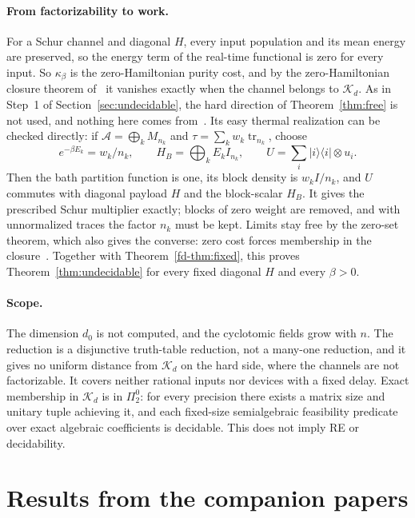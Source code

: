 \documentclass[11pt]{article}
\theoremstyle{definition}
\theoremstyle{remark}
\newcommand{\Trt}{\kappa_\beta}
\providecommand{\tr}{\operatorname{tr}}
\providecommand{\K}{\mathcal K}
\begin{document}
\paragraph{From factorizability to work.}
For a Schur channel and diagonal $H$, every input population and its mean energy are preserved, so the energy term of the real-time functional is zero for every input. So $\Trt$ is the zero-Hamiltonian purity cost, and by the zero-Hamiltonian closure theorem of~\cite{Memory,ClosedMemory} it vanishes exactly when the channel belongs to $\K_d$. As in Step~1 of Section~\ref{sec:undecidable}, the hard direction of Theorem~\ref{thm:free} is not used, and nothing here comes from~\cite{FMS}. Its easy thermal realization can be checked directly: if
$\mathcal A=\bigoplus_kM_{n_k}$ and $\tau=\sum_kw_k\tr_{n_k}$, choose
\[
e^{-\beta E_k}=w_k/n_k,\qquad H_B=\bigoplus_kE_kI_{n_k},\qquad
U=\sum_i|i\rangle\langle i|\otimes u_i.
\]
Then the bath partition function is one, its block density is $w_kI/n_k$, and $U$ commutes with diagonal payload $H$ and the block-scalar $H_B$. It gives the prescribed Schur multiplier exactly; blocks of zero weight are removed, and with unnormalized traces the factor $n_k$ must be kept. Limits stay free by the zero-set theorem, which also gives the converse: zero cost forces membership in the closure~\cite{Memory,ClosedMemory}. Together with Theorem~\ref{fd-thm:fixed}, this proves Theorem~\ref{thm:undecidable} for every fixed diagonal $H$ and every $\beta>0$.

\paragraph{Scope.}
The dimension $d_0$ is not computed, and the cyclotomic fields grow with $n$. The reduction is a disjunctive truth-table reduction, not a many-one reduction, and it gives no uniform distance from $\K_d$ on the hard side, where the channels are not factorizable. It covers neither rational inputs nor devices with a fixed delay. Exact membership in $\K_d$ is in $\Pi^0_2$: for every precision there exists a matrix size and unitary tuple achieving it, and each fixed-size semialgebraic feasibility predicate over exact algebraic coefficients is decidable. This does not imply RE or decidability.

\section{Results from the companion papers}\label{app:companions}
\end{document}
